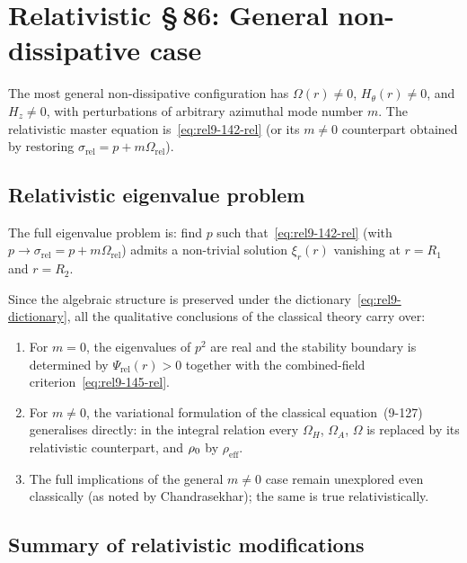 \section{Relativistic \S\,86: General non-dissipative case}
\label{sec:rel9-86}

The most general non-dissipative configuration has $\Omega(r) \ne 0$,
$H_\theta(r) \ne 0$, and $H_z \ne 0$, with perturbations of
arbitrary azimuthal mode number $m$.  The relativistic master equation
is~\eqref{eq:rel9-142-rel} (or its $m \ne 0$ counterpart obtained by
restoring $\sigma_{\mathrm{rel}} = p + m\Omega_{\mathrm{rel}}$).

\subsection{Relativistic eigenvalue problem}

The full eigenvalue problem is: find
$p$ such that~\eqref{eq:rel9-142-rel} (with $p \to
\sigma_{\mathrm{rel}} = p + m\Omega_{\mathrm{rel}}$) admits
a non-trivial solution $\xi_r(r)$ vanishing at $r = R_1$ and
$r = R_2$.

Since the algebraic structure is preserved under the
dictionary~\eqref{eq:rel9-dictionary}, all the qualitative
conclusions of the classical theory carry over:

\begin{enumerate}
\item For $m = 0$, the eigenvalues of $p^{2}$ are real and the
  stability boundary is determined by
  $\Psi_{\mathrm{rel}}(r) > 0$ together with
  the combined-field criterion~\eqref{eq:rel9-145-rel}.

\item For $m \ne 0$, the variational formulation of the classical
  equation~(9-127) generalises directly: in the integral relation
  every $\Omega_H$, $\Omega_A$, $\Omega$ is replaced by
  its relativistic counterpart, and $\rho_0$ by
  $\rho_{\mathrm{eff}}$.

\item The full implications of the general $m \ne 0$ case remain
  unexplored even classically (as noted by Chandrasekhar);
  the same is true relativistically.
\end{enumerate}

\subsection{Summary of relativistic modifications}

